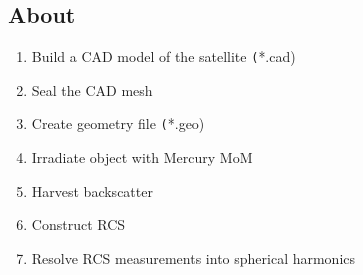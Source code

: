 \subsection{About}

\begin{enumerate}[label=(\Alph*)]
	\item Build a CAD model of the satellite \texttt(*.cad)
	\item Seal the CAD mesh
	\item Create geometry file \texttt(*.geo)
	\item Irradiate object with Mercury MoM
	\item Harvest backscatter
	\item Construct RCS
	\item Resolve RCS measurements into spherical harmonics
\end{enumerate}


\endinput  %
